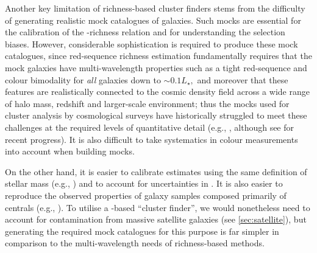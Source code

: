 \documentclass[fleqn,usenatbib,useAMS]{mnras}
\begin{document}
\begin{CJK*}{UTF8}{gbsn}
    Another key limitation of richness-based cluster finders stems from the difficulty of
    generating realistic mock catalogues of galaxies. 
    Such mocks are essential for the calibration of the \mvir{}-richness relation and for
    understanding the selection biases.
    However, considerable sophistication is required to produce these mock catalogues, since
    red-sequence richness estimation fundamentally requires that the mock galaxies have
    multi-wavelength properties such as a tight red-sequence and colour bimodality for {\em all}
    galaxies down to $\sim0.1L_{\star},$ and moreover that these features are realistically
    connected to the cosmic density field across a wide range of halo mass, redshift and
    larger-scale environment; thus the mocks used for cluster analysis by cosmological surveys have
    historically struggled to meet these challenges at the required levels of quantitative detail
    (e.g., \citealt{Trayford2015, Trayford2017, Nelson2018, DeRose2019}, although see
    \citealt{Hearin2020, DeRose2021} for recent progress). 
    It is also difficult to take systematics in colour measurements into account when building
    mocks.

    On the other hand, it is easier to calibrate \mstar{} estimates using the same definition of
    stellar mass (e.g., \citealt{Ardila2021}) and to account for uncertainties in \mstar{}. 
    It is also easier to reproduce the observed properties of galaxy samples composed primarily of
    centrals (e.g., \citealt{Moster2020}).
    To utilise a \mstar{}-based ``cluster finder'', we would nonetheless need to account for
    contamination from massive satellite galaxies (see \ref{sec:satellite}), but generating the
    required mock catalogues for this purpose is far simpler in comparison to the multi-wavelength
    needs of richness-based methods.  
    

\end{CJK*}
\end{document}
